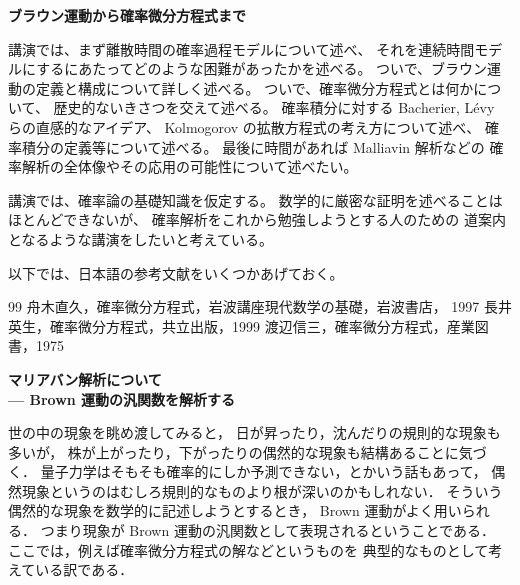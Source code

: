 \documentclass[uplatex,dvipdfmx]{jlreq}
\begin{document}
\begin{center}
  {\Large\bfseries ブラウン運動から確率微分方程式まで}
\end{center}

\bigskip
\hspace*{\fill}{\large\bfseries 楠岡　成雄（東大・数理）}

\bigskip

講演では、まず離散時間の確率過程モデルについて述べ、
それを連続時間モデルにするにあたってどのような困難があったかを述べる。
ついで、ブラウン運動の定義と構成について詳しく述べる。
ついで、確率微分方程式とは何かについて、
歴史的ないきさつを交えて述べる。
確率積分に対する Bacherier, L\'evy らの直感的なアイデア、
Kolmogorov の拡散方程式の考え方について述べ、
確率積分の定義等について述べる。
最後に時間があれば
Malliavin 解析などの
確率解析の全体像やその応用の可能性について述べたい。

講演では、確率論の基礎知識を仮定する。
数学的に厳密な証明を述べることはほとんどできないが、
確率解析をこれから勉強しようとする人のための
道案内となるような講演をしたいと考えている。

以下では、日本語の参考文献をいくつかあげておく。

\begin{thebibliography}{99}
舟木直久，確率微分方程式，岩波講座現代数学の基礎，岩波書店，
1997
長井英生，確率微分方程式，共立出版，1999
渡辺信三，確率微分方程式，産業図書，1975
\end{thebibliography}

\newpage

\begin{center}
  {\Large\bfseries マリアバン解析について\\
  \normalsize --- Brown 運動の汎関数を解析する}
\end{center}

\bigskip
\hspace*{\fill}{\large\bfseries 重川　一郎（京都大学大学院理学研究科）}

\bigskip

世の中の現象を眺め渡してみると，
日が昇ったり，沈んだりの規則的な現象も多いが，
株が上がったり，下がったりの偶然的な現象も結構あることに気づく．
量子力学はそもそも確率的にしか予測できない，とかいう話もあって，
偶然現象というのはむしろ規則的なものより根が深いのかもしれない．
そういう偶然的な現象を数学的に記述しようとするとき，
Brown 運動がよく用いられる．
つまり現象が Brown 運動の汎関数として表現されるということである．
ここでは，例えば確率微分方程式の解などというものを
典型的なものとして考えている訳である．
\end{document}
